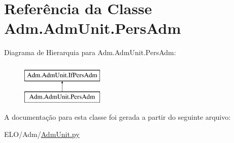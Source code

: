 \hypertarget{classAdm_1_1AdmUnit_1_1PersAdm}{\section{Referência da Classe Adm.\-Adm\-Unit.\-Pers\-Adm}
\label{dc/d1a/classAdm_1_1AdmUnit_1_1PersAdm}
}
Diagrama de Hierarquia para Adm.\-Adm\-Unit.\-Pers\-Adm\-:\begin{figure}[H]
\begin{center}
\leavevmode
\includegraphics[height=2.000000cm]{dc/d1a/classAdm_1_1AdmUnit_1_1PersAdm}
\end{center}
\end{figure}


A documentação para esta classe foi gerada a partir do seguinte arquivo\-:\begin{DoxyCompactItemize}
\item 
E\-L\-O/\-Adm/\hyperlink{AdmUnit_8py}{Adm\-Unit.\-py}\end{DoxyCompactItemize}
